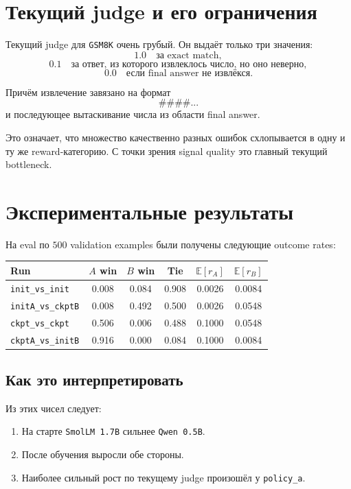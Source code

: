 \documentclass[11pt,a4paper]{article}
\begin{document}
\section{Текущий judge и его ограничения}

Текущий judge для \texttt{GSM8K} очень грубый. Он выдаёт только три значения:
\[
1.0 \quad \text{за exact match},
\]
\[
0.1 \quad \text{за ответ, из которого извлеклось число, но оно неверно},
\]
\[
0.0 \quad \text{если final answer не извлёкся}.
\]

Причём извлечение завязано на формат
\[
\texttt{\#\#\#\# ...}
\]
и последующее вытаскивание числа из области final answer.

Это означает, что множество качественно разных ошибок схлопывается в одну и ту же reward-категорию. С точки зрения signal quality это главный текущий bottleneck.

\section{Экспериментальные результаты}

На eval по $500$ validation examples были получены следующие outcome rates:

\begin{center}
\begin{tabular}{lccccc}
\toprule
Run & $A$ win & $B$ win & Tie & $\mathbb E[r_A]$ & $\mathbb E[r_B]$ \\
\midrule
\texttt{init\_vs\_init} & 0.008 & 0.084 & 0.908 & 0.0026 & 0.0084 \\
\texttt{initA\_vs\_ckptB} & 0.008 & 0.492 & 0.500 & 0.0026 & 0.0548 \\
\texttt{ckpt\_vs\_ckpt} & 0.506 & 0.006 & 0.488 & 0.1000 & 0.0548 \\
\texttt{ckptA\_vs\_initB} & 0.916 & 0.000 & 0.084 & 0.1000 & 0.0084 \\
\bottomrule
\end{tabular}
\end{center}

\subsection{Как это интерпретировать}

Из этих чисел следует:
\begin{enumerate}[label=\arabic*.]
  \item На старте \texttt{SmolLM 1.7B} сильнее \texttt{Qwen 0.5B}.
  \item После обучения выросли обе стороны.
  \item Наиболее сильный рост по текущему judge произошёл у \texttt{policy\_a}.
\end{enumerate}
\end{document}
